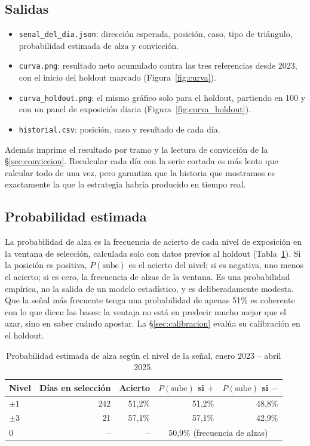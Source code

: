 \documentclass[10pt,a4paper]{article}
\begin{document}
\subsection{Salidas}

\begin{itemize}
  \item \texttt{senal\_del\_dia.json}: dirección esperada, posición, caso, tipo de
        triángulo, probabilidad estimada de alza y convicción.
  \item \texttt{curva.png}: resultado neto acumulado contra las tres referencias desde
        2023, con el inicio del holdout marcado (Figura~\ref{fig:curva}).
  \item \texttt{curva\_holdout.png}: el mismo gráfico solo para el holdout, partiendo
        en 100 y con un panel de exposición diaria (Figura~\ref{fig:curva_holdout}).
  \item \texttt{historial.csv}: posición, caso y resultado de cada día.
\end{itemize}
Además imprime el resultado por tramo y la lectura de convicción de la
§\ref{sec:conviccion}. Recalcular cada día con la serie cortada es más lento que calcular
todo de una vez, pero garantiza que la historia que mostramos es exactamente la que la
estrategia habría producido en tiempo real.

\subsection{Probabilidad estimada}\label{sec:prob}

La probabilidad de alza es la frecuencia de acierto de cada nivel de exposición en la
ventana de selección, calculada solo con datos previos al holdout
(Tabla~\ref{tab:prob}). Si la posición es positiva, $P(\text{sube})$ es el acierto del
nivel; si es negativa, uno menos el acierto; si es cero, la frecuencia de alzas de la
ventana. Es una probabilidad empírica, no la salida de un modelo estadístico, y es
deliberadamente modesta. Que la señal más frecuente tenga una probabilidad de apenas 51\%
es coherente con lo que dicen las bases: la ventaja no está en predecir mucho mejor que
el azar, sino en saber cuándo apostar. La §\ref{sec:calibracion} evalúa su
calibración en el holdout.

\begin{table}[htb]\centering\small
\begin{tabular}{@{}lrrrr@{}}
\toprule
Nivel & Días en selección & Acierto & $P(\text{sube})$ si $+$ & $P(\text{sube})$ si $-$ \\
\midrule
$\pm1$ & 242 & 51{,}2\% & 51{,}2\% & 48{,}8\% \\
$\pm3$ & 21  & 57{,}1\% & 57{,}1\% & 42{,}9\% \\
0      & --  & --       & \multicolumn{2}{c}{50{,}9\% (frecuencia de alzas)} \\
\bottomrule
\end{tabular}
\caption{Probabilidad estimada de alza según el nivel de la señal, enero 2023 -- abril
2025.}\label{tab:prob}
\end{table}
\end{document}
